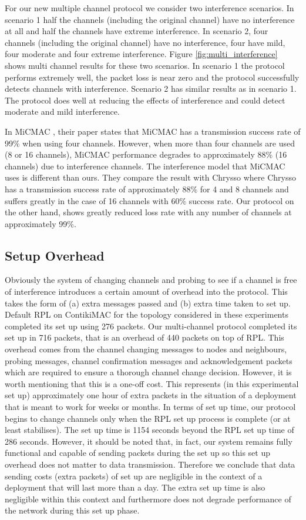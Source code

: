 For our new multiple channel protocol we consider two interference scenarios.
In scenario 1 half the channels (including the original channel) have no
interference at all and half the channels have extreme interference.
In scenario 2, four channels (including the original channel) have no
interference, four have mild, four moderate and four extreme interference.
Figure \ref{fig:multi_interference} shows multi channel results for these
two scenarios.  In scenario 1 the protocol performs extremely well, the packet loss is near zero and the protocol successfully detects channels with interference.
Scenario 2 has similar results as in scenario 1. The protocol does well at reducing the effects of interference and could detect moderate and mild interference.

In MiCMAC \cite{micmac}, their paper states that MiCMAC has a transmission success rate of 99\% when using four channels. However, when more than four channels are used (8 or 16 channels), MiCMAC performance degrades to approximately 88\% (16 channels) due to interference channels. The interference model that MiCMAC uses is different than ours. They compare the result with Chrysso where Chrysso has a transmission success rate of approximately 88\% for 4 and 8 channels and suffers greatly in the case of 16 channels with 60\% success rate.
Our protocol on the other hand, shows greatly reduced loss rate with any number of channels at approximately 99\%.

\subsection{Setup Overhead}
Obviously the system of changing channels and probing to see if a channel is free of interference introduces a certain amount of overhead into
the protocol. This takes the form of (a) extra messages passed and (b) extra time taken to set up. Default RPL on ContikiMAC for the topology considered in these experiments completed its set up using 276 packets. Our multi-channel protocol completed its set up in 716 packets, that is an overhead of 440 packets on top of RPL. 
This overhead comes from the channel changing messages to nodes and neighbours, probing messages, channel confirmation messages and acknowledgement packets which are required to ensure a thorough channel change decision.
However, it is worth mentioning that this is a one-off cost. This represents (in this experimental set up) approximately one hour of extra packets in the situation of a deployment that is meant to work for weeks or months.  In terms of set up time, our protocol begins to change channels only when the RPL set up process is complete (or at least stabilises). The set up time is 1154 seconds beyond the RPL set up time of 286 seconds. However, it should be noted that, in fact, our system remains fully functional and capable of sending packets during the set up so this set up overhead does not matter to data transmission.
Therefore we conclude that data sending costs (extra packets) of set up are negligible in the context of a deployment that will last more than a day. The extra set up time is also negligible within this context and furthermore does not degrade performance of the network during this set up phase.